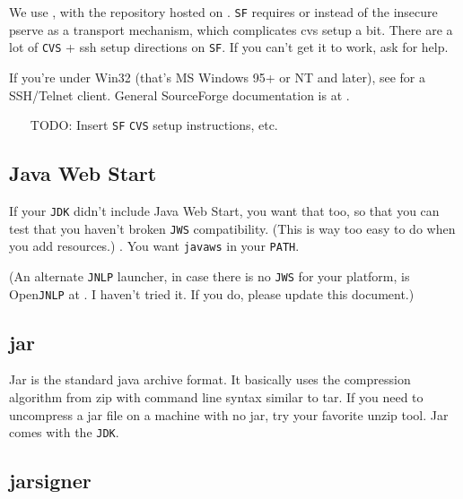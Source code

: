 \documentclass{article}
\begin{document}
We use , with the repository 
hosted on .
\texttt{SF} requires  or
 instead of the insecure pserve
as a transport mechanism, which complicates cvs setup a bit. There are a
lot of \texttt{CVS} + ssh setup directions on \texttt{SF}. If you can't
get it to work, ask for help.

If you're under Win32 (that's MS Windows 95+ or NT and later), see
 for a SSH/Telnet client. General SourceForge
documentation is at .

\begin{itemize}
\item[TODO:] Insert \texttt{SF} \texttt{CVS} setup instructions, etc.
\end{itemize}

\subsection{Java Web Start}

If your \texttt{JDK} didn't include Java Web Start, you want that too, so 
that you can test that you haven't broken \texttt{JWS} compatibility. (This
is way too easy to do when you add resources.)
. You want \texttt{javaws} in your
\texttt{PATH}.

(An alternate \texttt{JNLP} launcher, in case there is no \texttt{JWS} for
your platform, is Open\texttt{JNLP} at
.
I haven't tried it. If you do, please update this document.)

\subsection{jar}

Jar is the standard java archive format. It basically uses the compression 
algorithm from zip with command line syntax similar to tar. If you need to 
uncompress a jar file on a machine with no jar, try your favorite unzip tool. 
Jar comes with the \texttt{JDK}.

\subsection{jarsigner}
\end{document}
